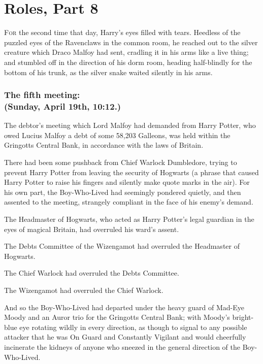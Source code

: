 \chapter{Roles, Part 8}


\lettrine{F}{or} the second
time that day, Harry's eyes filled with tears. Heedless of the puzzled eyes of
the Ravenclaws in the common room, he reached out to the silver creature which
Draco Malfoy had sent, cradling it in his arms like a live thing; and stumbled
off in the direction of his dorm room, heading half-blindly for the bottom of
his trunk, as the silver snake waited silently in his arms.
\sbreak
\vspace{-2\baselineskip}
\subsection{The fifth meeting:\\
(Sunday, April 19th, 10:12\AM.)}

The debtor's meeting which Lord Malfoy had demanded from Harry Potter, who owed
Lucius Malfoy a debt of some 58,203 Galleons, was held within the Gringotts
Central Bank, in accordance with the laws of Britain.

There had been some pushback from Chief Warlock Dumbledore, trying to prevent
Harry Potter from leaving the security of Hogwarts (a phrase that caused Harry
Potter to raise his fingers and silently make quote marks in the air). For his
own part, the Boy-Who-Lived had seemingly pondered quietly, and then assented
to the meeting, strangely compliant in the face of his enemy's demand.

The Headmaster of Hogwarts, who acted as Harry Potter's legal guardian in the
eyes of magical Britain, had overruled his ward's assent.

The Debts Committee of the Wizengamot had overruled the Headmaster of Hogwarts.

The Chief Warlock had overruled the Debts Committee.

The Wizengamot had overruled the Chief Warlock.

And so the Boy-Who-Lived had departed under the heavy guard of Mad-Eye Moody
and an Auror trio for the Gringotts Central Bank; with Moody's bright-blue eye
rotating wildly in every direction, as though to signal to any possible
attacker that he was On Guard and Constantly Vigilant and would cheerfully
incinerate the kidneys of anyone who sneezed in the general direction of the
Boy-Who-Lived.

